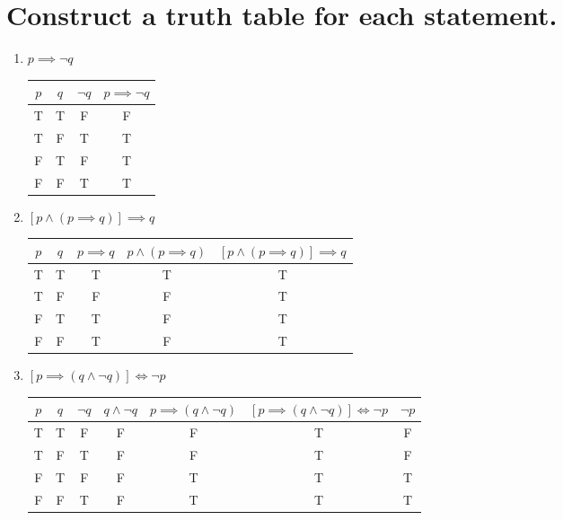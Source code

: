 \documentclass[11pt]{article} %
\begin{document}
\section{Construct a truth table for each statement.}
\begin{enumerate}
	\item $p \implies \neg q$
	\begin{center}
	\begin{tabular}{ |c|c|c|c| }
	\hline
	$p$ & $q$ & $\neg q$ & $p \implies \neg q$ \\
	\hline
	T & T & F & F \\
	T & F & T & T \\
	F & T & F & T \\
	F & F & T & T \\
	\hline
	\end{tabular}
	\end{center}
	\item $[p \land (p \implies q)] \implies q$
	\begin{center}
	\begin{tabular}{|c|c|c|c|c|}
	\hline
	$p$ & $q$ & $p \implies q$ & $p \land (p \implies q)$ & $[p \land (p \implies q)] \implies q$ \\
	\hline
	T & T & T & T & T \\
	T & F & F & F & T \\
	F & T & T & F & T \\
	F & F & T & F & T \\
	\hline
	\end{tabular}
	\end{center}
	\item $[p \implies (q \land \neg q)] \iff \neg p$
	\begin{center}
	\begin{tabular}{|c|c|c|c|c|c|c|}
	\hline
	$p$ & $q$ & $\neg q$ & $q \land \neg q$ & $p \implies (q \land \neg q)$ & $[p \implies (q \land \neg q)] \iff \neg p$ & $\neg p$ \\
	\hline
	T & T & F & F & F & T & F\\
	T & F & T & F & F & T & F\\
	F & T & F & F & T & T & T\\
	F & F & T & F & T & T & T\\
	\hline
	\end{tabular}
	\end{center}
\end{enumerate}
\end{document}
